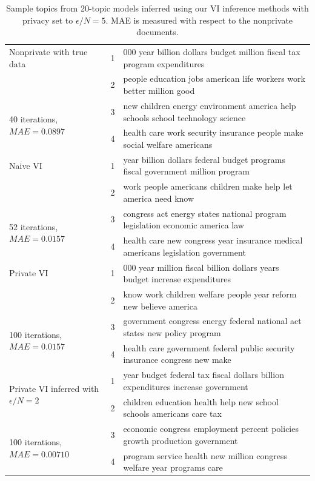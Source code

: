 \documentclass[letterpaper]{article}
\begin{document}
  \begin{table}[t]
    \center
    \small
    \begin{tabular}{|p{1.3in}|r p{4.2in}|}
      \hline
      Nonprivate with true data
      & 1  & 000 year billion dollars budget million fiscal tax program expenditures \\
      & 2  & people education jobs american life workers work better million good \\
      \multirow{2}{1in}{40 iterations, $MAE = 0.0897$}
      & 3 & new children energy environment america help schools school technology science \\
      & 4 & health care work security insurance people make social welfare americans \\    
      \hline

      Naive VI
      & 1  & year billion dollars federal budget programs fiscal government million program \\
      & 2  & work people americans children make help let america need know \\
      \multirow{2}{1in}{52 iterations, $MAE = 0.0157$}
      & 3 & congress act energy states national program legislation economic america law \\
      & 4 & health care new congress year insurance medical americans legislation government \\     
      \hline

      Private VI
      & 1 & 000 year million fiscal billion dollars years budget increase expenditures \\
      & 2 & know work children welfare people year reform new believe america \\
      \multirow{2}{1in}{100 iterations, $MAE = 0.0157$}
      & 3 & government congress energy federal national act states new policy program \\
      & 4 & health care government federal public security insurance congress new make \\
      \hline
      
      \multirow{2}{1in}{Private VI inferred with $\epsilon/N = 2$}
      & 1 & year budget federal tax fiscal dollars billion expenditures increase government \\
      & 2 & children education health help new school schools americans care tax \\
      \multirow{2}{1in}{100 iterations, $MAE = 0.00710$}
      & 3 & economic congress employment percent policies growth production government \\
      & 4 & program service health new million congress welfare year programs care \\
      \hline
    \end{tabular}
    \caption{Sample topics from 20-topic models inferred using our VI inference methods with privacy set to $\epsilon/N = 5$. MAE is measured with respect to the nonprivate documents.}
    \label{tab:results_topics}
  \end{table}
\end{document}
